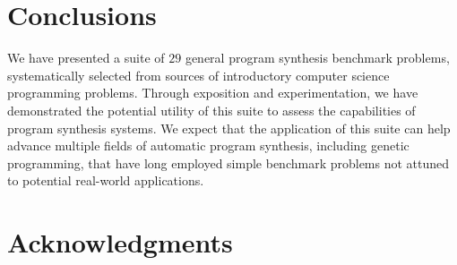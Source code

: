 \documentclass{sig-alternate}
\begin{document}
\section{Conclusions}

We have presented a suite of $29$ general program synthesis benchmark problems, systematically selected from sources of introductory computer science programming problems. Through exposition and experimentation, we have demonstrated the potential utility of this suite to assess the capabilities of program synthesis systems. We expect that the application of this suite can help advance multiple fields of automatic program synthesis, including genetic programming, that have long employed simple benchmark problems not attuned to potential real-world applications.





%




\section{Acknowledgments}
\end{document}
